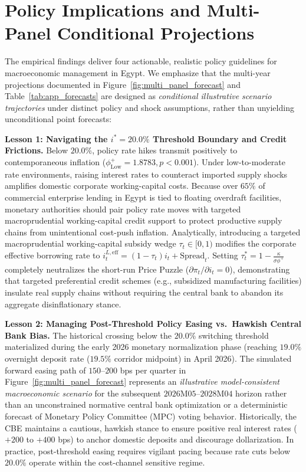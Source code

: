 \documentclass[review,12pt]{elsarticle}
\begin{document}
\section{Policy Implications and Multi-Panel Conditional Projections}
\label{sec:policy}

The empirical findings deliver four actionable, realistic policy guidelines for macroeconomic management in Egypt. We emphasize that the multi-year projections documented in Figure~\ref{fig:multi_panel_forecast} and Table~\ref{tab:app_forecasts} are designed as \textit{conditional illustrative scenario trajectories} under distinct policy and shock assumptions, rather than unyielding unconditional point forecasts:

\textbf{Lesson 1: Navigating the $i^{*}=20.0\%$ Threshold Boundary and Credit Frictions.}
Below $20.0\%$, policy rate hikes transmit positively to contemporaneous inflation ($\phi_{\text{Low}}^{+} = 1.8783, p < 0.001$).
Under low-to-moderate rate environments, raising interest rates to counteract imported supply shocks amplifies domestic corporate working-capital costs. Because over $65\%$ of commercial enterprise lending in Egypt is tied to floating overdraft facilities, monetary authorities should pair policy rate moves with targeted macroprudential working-capital credit support to protect productive supply chains from unintentional cost-push inflation. Analytically, introducing a targeted macroprudential working-capital subsidy wedge $\tau_t \in [0, 1)$ modifies the corporate effective borrowing rate to $i_t^{L, \text{eff}} = (1 - \tau_t)i_t + \text{Spread}_t$. Setting $\tau_t^* = 1 - \frac{\kappa}{\sigma \phi^+}$ completely neutralizes the short-run Price Puzzle ($\partial \pi_t / \partial i_t = 0$), demonstrating that targeted preferential credit schemes (e.g., subsidized manufacturing facilities) insulate real supply chains without requiring the central bank to abandon its aggregate disinflationary stance.

\textbf{Lesson 2: Managing Post-Threshold Policy Easing vs.\ Hawkish Central Bank Bias.}
The historical crossing below the $20.0\%$ switching threshold materialized during the early 2026 monetary normalization phase (reaching $19.0\%$ overnight deposit rate ($19.5\%$ corridor midpoint) in April 2026). The simulated forward easing path of $150$--$200$ bps per quarter in Figure~\ref{fig:multi_panel_forecast} represents an \textit{illustrative model-consistent macroeconomic scenario} for the subsequent $2026\text{M}05$--$2028\text{M}04$ horizon rather than an unconstrained normative central bank optimization or a deterministic forecast of Monetary Policy Committee (MPC) voting behavior. Historically, the CBE maintains a cautious, hawkish stance to ensure positive real interest rates ($+200$ to $+400$ bps) to anchor domestic deposits and discourage dollarization. In practice, post-threshold easing requires vigilant pacing because rate cuts below $20.0\%$ operate within the cost-channel sensitive regime.
\end{document}
